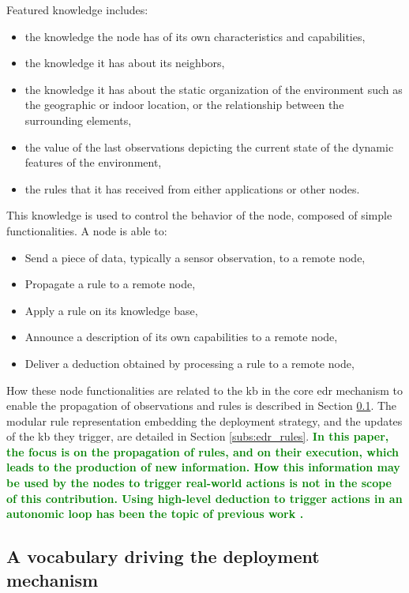 \documentclass{iosart2c}
\newcommand{\added}[1]{\textcolor{green}{\textbf{#1}}}
\begin{document}
Featured knowledge includes:
\begin{itemize}
	\item the knowledge the node has of its own characteristics and capabilities,
	\item the knowledge it has about its neighbors,
	\item the knowledge it has about the static organization of the environment such as the geographic or indoor location, or the relationship between the surrounding elements,
	\item the value of the last observations depicting the current state of the dynamic features of the environment,
	\item the rules that it has received from either applications or other nodes.
\end{itemize}

This knowledge is used to control the behavior of the node, composed of simple functionalities.
A node is able to:
\begin{itemize}
	\item Send a piece of data, typically a sensor observation, to a remote node,
	\item Propagate a rule to a remote node,
	\item Apply a rule on its knowledge base,
	\item Announce a description of its own capabilities to a remote node,
	\item Deliver a deduction obtained by processing a rule to a remote node, 
\end{itemize}

How these node functionalities are related to the \gls{kb} in the core \gls{edr} mechanism to enable the propagation of observations and rules is described in Section \textsection \ref{subs:edr_vocabulary}.
The modular rule representation embedding the deployment strategy, and the updates of the \gls{kb} they trigger, are detailed in Section \textsection \ref{subs:edr_rules}.
\added{In this paper, the focus is on the propagation of rules, and on their execution, which leads to the production of new information. 
How this information may be used by the nodes to trigger real-world actions is not in the scope of this contribution. 
Using high-level deduction to trigger actions in an autonomic loop has been the topic of previous work \cite{Seydoux2016}.}

\subsection{A vocabulary driving the deployment mechanism}
\label{subs:edr_vocabulary}
\end{document}
